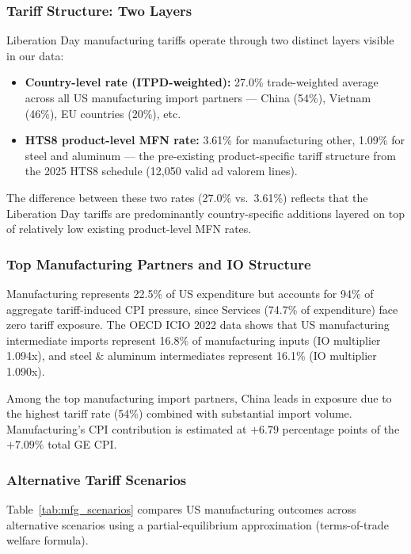 \documentclass[12pt]{article}
\begin{document}
\subsubsection{Tariff Structure: Two Layers}

Liberation Day manufacturing tariffs operate through two distinct layers
visible in our data:

\begin{itemize}
    \item \textbf{Country-level rate (ITPD-weighted):} 27.0\% trade-weighted
    average across all US manufacturing import partners --- China (54\%),
    Vietnam (46\%), EU countries (20\%), etc.
    \item \textbf{HTS8 product-level MFN rate:} 3.61\% for manufacturing
    other, 1.09\% for steel and aluminum --- the pre-existing product-specific
    tariff structure from the 2025 HTS8 schedule (12,050 valid ad valorem lines).
\end{itemize}

The difference between these two rates (27.0\% vs.\ 3.61\%) reflects that
the Liberation Day tariffs are predominantly country-specific additions
layered on top of relatively low existing product-level MFN rates.

\subsubsection{Top Manufacturing Partners and IO Structure}

Manufacturing represents 22.5\% of US expenditure but accounts for 94\%
of aggregate tariff-induced CPI pressure, since Services (74.7\% of
expenditure) face zero tariff exposure. The OECD ICIO 2022 data shows
that US manufacturing intermediate imports represent 16.8\% of
manufacturing inputs (IO multiplier 1.094x), and steel \& aluminum
intermediates represent 16.1\% (IO multiplier 1.090x).

Among the top manufacturing import partners, China leads in exposure due
to the highest tariff rate (54\%) combined with substantial import volume.
Manufacturing's CPI contribution is estimated at $+6.79$ percentage points
of the $+7.09\%$ total GE CPI.

\subsubsection{Alternative Tariff Scenarios}

Table~\ref{tab:mfg_scenarios} compares US manufacturing outcomes across
alternative scenarios using a partial-equilibrium approximation
(terms-of-trade welfare formula).
\end{document}
